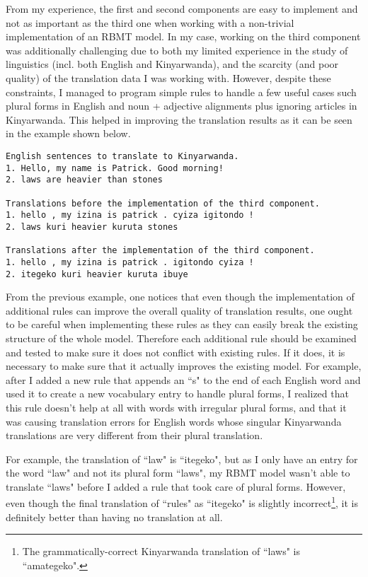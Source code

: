 From my experience, the first and second components are easy to implement and not as important as the third one when working with a non-trivial implementation of an RBMT model. In my case, working on the third component was additionally challenging due to both my limited experience in the study of linguistics (incl. both English and Kinyarwanda), and the scarcity (and poor quality) of the translation data I was working with. However, despite these constraints, I managed to program simple rules to handle a few useful cases such plural forms in English and noun + adjective alignments plus ignoring articles in Kinyarwanda. This helped in improving the translation results as it can be seen in the example shown below.
\begin{lstlisting}
English sentences to translate to Kinyarwanda.
1. Hello, my name is Patrick. Good morning!
2. laws are heavier than stones

Translations before the implementation of the third component.
1. hello , my izina is patrick . cyiza igitondo ! 
2. laws kuri heavier kuruta stones

Translations after the implementation of the third component.
1. hello , my izina is patrick . igitondo cyiza !  
2. itegeko kuri heavier kuruta ibuye 
\end{lstlisting}
From the previous example, one notices that even though the implementation of additional rules can improve the overall quality of translation results, one ought to be careful when implementing these rules as they can easily break the existing structure of the whole model. Therefore each additional rule should be examined and tested to make sure it does not conﬂict with existing rules.  If it does, it is necessary to make sure that it actually improves the existing model. For example, after I added a new rule that appends an ``s" to the end of each English word and used it to create a new vocabulary entry to handle plural forms, I realized that this rule doesn't help at all with words with irregular plural forms, and that it was causing translation errors for English words whose singular Kinyarwanda translations are very different from their plural translation. 

For example, the translation of ``law" is ``itegeko", but as I only have an entry for the word ``law" and not its plural form ``laws", my RBMT model wasn't able to translate ``laws" before I added a rule that took care of plural forms. However, even though the final translation of ``rules" as ``itegeko" is slightly incorrect\footnote{The grammatically-correct Kinyarwanda translation of ``laws" is ``amategeko".}, it is definitely better than having no translation at all.  

